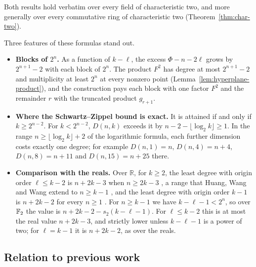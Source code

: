Both results hold verbatim over every field of characteristic two, and more
generally over every commutative ring of characteristic two
(Theorem~\ref{thm:char-two}).

Three features of these formulas stand out.
\begin{itemize}
 \item \textbf{Blocks of \(2^n\).} As a function of \(k-\ell\), the excess
 \(\Phi-n-2\ell\) grows by \(2^{n+1}-2\) with each block of \(2^n\). The
 product \(F^2\) has degree at most \(2^{n+1}-2\) and multiplicity at least
 \(2^n\) at every nonzero point (Lemma~\ref{lem:hyperplane-product}), and the
 construction pays each block with one factor \(F^2\) and the remainder \(r\)
 with the truncated product \(g_{r+1}\).
 \item \textbf{Where the Schwartz--Zippel bound is exact.} It is attained if
 and only if \(k\ge2^{n-2}\). For \(k<2^{n-2}\), \(D(n,k)\) exceeds it by
 \(n-2-\lfloor\log_2k\rfloor\ge1\). In the range \(n\ge\lfloor\log_2k\rfloor+2\)
 of the logarithmic formula, each further dimension costs exactly one degree;
 for example \(D(n,1)=n\), \(D(n,4)=n+4\), \(D(n,8)=n+11\) and \(D(n,15)=n+25\)
 there.
 \item \textbf{Comparison with the reals.} Over \(\mathbb R\), for \(k\ge2\),
 the least degree with origin order \(\ell\le k-2\) is \(n+2k-3\) when
 \(n\ge2k-3\) \cite[Theorem~1.4]{SW20}, a range that Huang, Wang and Wang extend
 to \(n\ge k-1\) \cite[Theorem~1.8]{HWW26}, and the least degree with origin
 order \(k-1\) is \(n+2k-2\) for every \(n\ge1\) \cite[Theorem~1.5]{SW20}. For
 \(n\ge k-1\) we have \(k-\ell-1<2^n\), so over \(\mathbb F_2\) the value is
 \(n+2k-2-s_2(k-\ell-1)\). For \(\ell\le k-2\) this is at most the real value
 \(n+2k-3\), and strictly lower unless \(k-\ell-1\) is a power of two; for
 \(\ell=k-1\) it is \(n+2k-2\), as over the reals.
\end{itemize}

\subsection{Relation to previous work}

